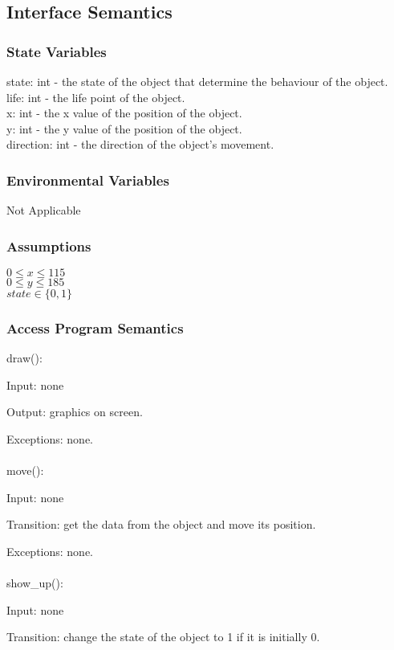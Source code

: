 \documentclass[12,english]{article}
\begin{document}
		\subsection{Interface Semantics}
		\subsubsection{State Variables}
		state: int - the state of the object that determine the behaviour of the object.\\
		life: int - the life point of the object.\\
		x: int - the x value of the position of the object.\\
		y: int - the y value of the position of the object.\\
		direction: int - the direction of the object's movement.\\
		
		\subsubsection{Environmental Variables}
		Not Applicable
		
		\subsubsection{Assumptions}
		$0\leq x\leq 115$\\
		$0\leq y\leq 185$\\
		$state \in \{0, 1\}$
		
		\subsubsection{Access Program Semantics}
		draw():
		
		Input: none
		
		Output: graphics on screen.
		
		Exceptions: none.\\
		\\
		move():
		
		Input: none
		
		Transition: get the data from the object and move its position.
		
		Exceptions: none.\\
		\\
		show\_up():
		
		Input: none
		
		Transition: change the state of the object to 1 if it is initially 0.
		
\end{document}
